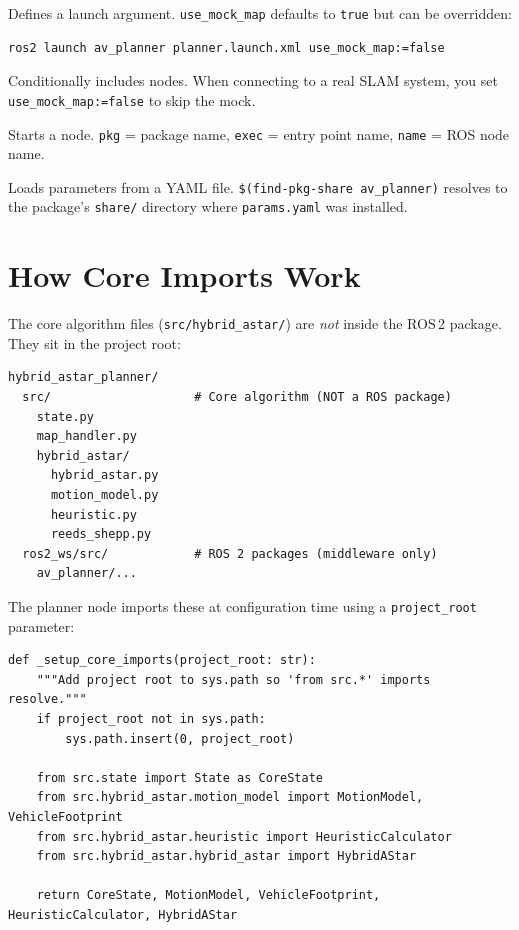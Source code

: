 \documentclass[12pt, a4paper]{article}
\begin{document}
\begin{description}[nosep, style=nextline]
    \item[\texttt{<arg>}] Defines a launch argument. \texttt{use\_mock\_map}
    defaults to \texttt{true} but can be overridden:
    \begin{lstlisting}[style=bash]
ros2 launch av_planner planner.launch.xml use_mock_map:=false
    \end{lstlisting}

    \item[\texttt{<group if=...>}] Conditionally includes nodes.
    When connecting to a real SLAM system, you set \texttt{use\_mock\_map:=false}
    to skip the mock.

    \item[\texttt{<node>}] Starts a node.
    \texttt{pkg} = package name, \texttt{exec} = entry point name,
    \texttt{name} = ROS node name.

    \item[\texttt{<param from=...>}] Loads parameters from a YAML file.
    \texttt{\$(find-pkg-share av\_planner)} resolves to the package's
    \texttt{share/} directory where \texttt{params.yaml} was installed.
\end{description}


\section{How Core Imports Work}
\label{sec:imports}

The core algorithm files (\texttt{src/hybrid\_astar/}) are \emph{not}
inside the ROS\,2 package. They sit in the project root:

\begin{lstlisting}[style=bash]
hybrid_astar_planner/
  src/                    # Core algorithm (NOT a ROS package)
    state.py
    map_handler.py
    hybrid_astar/
      hybrid_astar.py
      motion_model.py
      heuristic.py
      reeds_shepp.py
  ros2_ws/src/            # ROS 2 packages (middleware only)
    av_planner/...
\end{lstlisting}

The planner node imports these at configuration time using a
\texttt{project\_root} parameter:

\begin{lstlisting}[style=python, caption={Dynamic core imports (planner\_node.py)}]
def _setup_core_imports(project_root: str):
    """Add project root to sys.path so 'from src.*' imports resolve."""
    if project_root not in sys.path:
        sys.path.insert(0, project_root)

    from src.state import State as CoreState
    from src.hybrid_astar.motion_model import MotionModel, VehicleFootprint
    from src.hybrid_astar.heuristic import HeuristicCalculator
    from src.hybrid_astar.hybrid_astar import HybridAStar

    return CoreState, MotionModel, VehicleFootprint, HeuristicCalculator, HybridAStar
\end{lstlisting}
\end{document}
